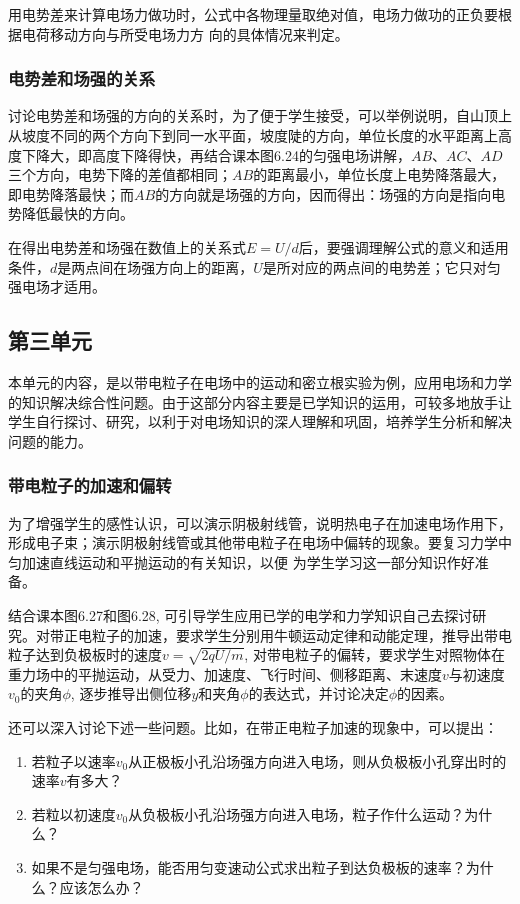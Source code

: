用电势差来计算电场力做功时，公式中各物理量取绝对值，电场力做功的正负要根据电荷移动方向与所受电场力方
向的具体情况来判定。

\subsubsection{电势差和场强的关系}

讨论电势差和场强的方向的关系时，为了便于学生接受，可以举例说明，自山顶上从坡度不同的两个方向下到同一水平面，坡度陡的方向，单位长度的水平距离上高度下降大，即高度下降得快，再结合课本图6.24的匀强电场讲解，$AB$、$AC$、$AD$三个方向，电势下降的差值都相同；$AB$的距离最小，单位长度上电势降落最大，即电势降落最快；而$AB$的方向就是场强的方向，因而得出：场强的方向是指向电势降低最快的方向。

在得出电势差和场强在数值上的关系式$E=U/d$后，要强调理解公式的意义和适用条件，$d$是两点间在场强方向上的距离，$U$是所对应的两点间的电势差；它只对匀强电场才适用。

\subsection{第三单元}
本单元的内容，是以带电粒子在电场中的运动和密立根实验为例，应用电场和力学的知识解决综合性问题。由于这部分内容主要是已学知识的运用，可较多地放手让学生自行探讨、研究，以利于对电场知识的深人理解和巩固，培养学生分析和解决问题的能力。

\subsubsection{带电粒子的加速和偏转}

为了增强学生的感性认识，可以演示阴极射线管，说明热电子在加速电场作用下，形成电子束；演示阴极射线管或其他带电粒子在电场中偏转的现象。要复习力学中匀加速直线运动和平抛运动的有关知识，以便
为学生学习这一部分知识作好准备。

结合课本图6.27和图6.28, 可引导学生应用已学的电学和力学知识自己去探讨研究。对带正电粒子的加速，要求学生分别用牛顿运动定律和动能定理，推导出带电粒子达到负极板时的速度$v=\sqrt{2qU/m}$, 对带电粒子的偏转，要求学生对照物体在重力场中的平抛运动，从受力、加速度、飞行时间、侧移距离、末速度$v$与初速度$v_0$的夹角$\phi$, 逐步推导出侧位移$y$和夹角$\phi$的表达式，并讨论决定$\phi$的因素。

还可以深入讨论下述一些问题。比如，在带正电粒子加速的现象中，可以提出：
\begin{enumerate}
\item 若粒子以速率$v_0$从正极板小孔沿场强方向进入电场，则从负极板小孔穿出时的速率$v$有多大？
\item 若粒以初速度$v_0$从负极板小孔沿场强方向进入电场，粒子作什么运动？为什么？
\item 如果不是匀强电场，能否用匀变速动公式求出粒子到达负极板的速率？为什么？应该怎么办？
\end{enumerate}


